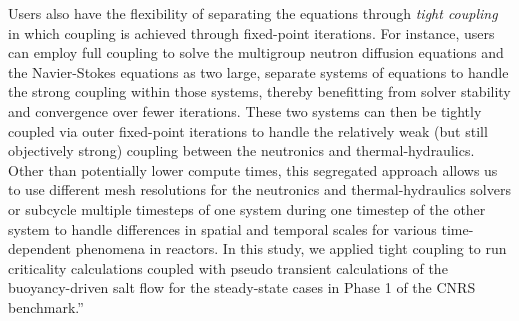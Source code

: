 \documentclass[answers,11pt]{exam}
\begin{document}
\begin{questions}
\begin{solution}
Users also have the flexibility of separating the equations through
\textit{tight coupling} in which coupling is achieved through
fixed-point iterations. For instance, users can employ full coupling to solve
the multigroup neutron diffusion equations and the Navier-Stokes equations as
two large, separate systems of equations to handle the strong coupling within
those systems, thereby benefitting from solver stability and convergence
over fewer iterations. These two systems can then be tightly coupled via outer
fixed-point iterations to handle the relatively weak (but still objectively
strong) coupling between the neutronics and thermal-hydraulics. Other than
potentially lower compute times, this segregated approach allows us to use
different mesh resolutions for the neutronics and thermal-hydraulics solvers
or subcycle multiple timesteps of one system during one timestep of the other
system to handle differences in spatial and temporal scales for various
time-dependent phenomena in reactors. In this study, we applied tight coupling
to run criticality calculations coupled with pseudo transient calculations of
the buoyancy-driven salt flow for the steady-state cases in Phase 1 of the CNRS
benchmark.''
        \end{solution}



\end{questions}
\end{document}
